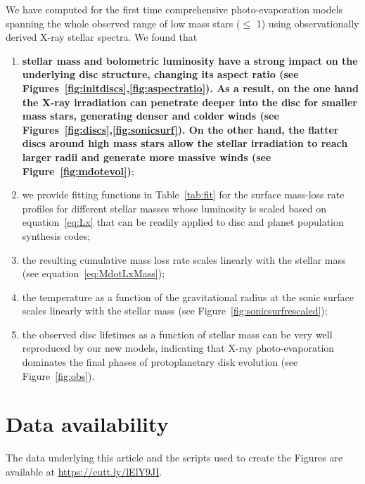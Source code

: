 \documentclass[usenatbib,useAMS,usedcolumn]{mnras}
\begin{document}
  We have computed for the first time comprehensive photo-evaporation models spanning the whole observed range of low mass stars ($\leq$ \SI{1}{\solarmass}) using observationally derived X-ray stellar spectra. 
  We found that

   \begin{enumerate}
      \item \textbf{stellar mass and bolometric luminosity have a strong impact on the underlying disc structure, changing its aspect ratio (see Figures~\ref{fig:initdiscs},\ref{fig:aspectratio}). 
      As a result, on the one hand the X-ray irradiation can penetrate deeper into the disc for smaller mass stars, generating denser and colder winds (see Figures~\ref{fig:discs},\ref{fig:sonicsurf}). On the other hand, the flatter discs around high mass stars allow the stellar irradiation to reach larger radii and generate more massive winds (see Figure~\ref{fig:mdotevol})};
      \item we provide fitting functions in Table~\ref{tab:fit} for the surface mass-loss rate profiles for different stellar masses whose luminosity is scaled based on equation~\ref{eq:Lx} that can be readily applied to disc and planet population synthesis codes;
      \item the resulting cumulative mass loss rate scales linearly with the stellar mass (see equation~\ref{eq:MdotLxMass});
      \item the temperature as a function of the gravitational radius at the sonic surface scales linearly with the stellar mass (see Figure~\ref{fig:sonicsurfrescaled});
      \item the observed disc lifetimes as a function of stellar mass can be very well reproduced by our new models, indicating that X-ray photo-evaporation dominates the final phases of protoplanetary disk evolution (see Figure~\ref{fig:obs}).
   \end{enumerate}

\section{Data availability}
   The data underlying this article and the scripts used to create the Figures are available at \href{https://cutt.ly/lElY9JI}{https://cutt.ly/lElY9JI}.
\end{document}
